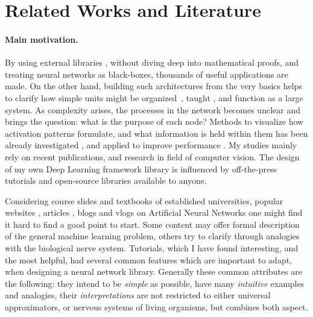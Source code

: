 \section{Related Works and Literature}

\paragraph{Main motivation.} By using external libraries \cite{TF, torch, caffe}, without diving deep into mathematical proofs, and treating neural networks as black-boxes, thousands of useful applications \cite{haykin2004comprehensive} are made. 
On the other hand, building such architectures from the very basics helps to clarify how simple units might be organized~\cite{milo2002network}, taught \cite{werbos1994roots}, and function \cite{hornik1989multilayer} as a large system. 
As complexity arises, the processes in the network becomes unclear and brings the question: what is the purpose of each node? 
Methods to visualize how activation patterns formulate, and what information is held within them has been already investigated \cite{yosinski2015understanding}, and applied to improve performance \cite{zeiler2014visualizing}. 
My studies mainly rely on recent publications, and research in field of computer vision. The design of my own Deep Learning framework library is influenced by off-the-press tutorials \cite{Goodfellow-et-al-2016-Book, deeplearningdotnet, nnsdl, stanfordlectures, gibiansky} and open-source libraries \cite{TF, torch, caffe} available to anyone.

Considering course slides \cite{stanfordlectures, oxfordlectures} and textbooks \cite{Goodfellow-et-al-2016-Book, werbos1994roots, bengio2009learning} of established universities, popular websites \cite{deeplearningdotnet, pedregosa2011scikit}, 
articles \cite{lecun2015deep}, blogs \cite{gibiansky, karpathyblog} and vlogs \cite{vlog1} on Artificial Neural Networks one might find it hard to find a good point to start. 
Some content may offer formal description of the general machine learning problem, others try to clarify through analogies with the biological nerve system.
Tutorials, which I have found interesting, and the most helpful, had several common features which are important to adapt, when designing a neural network library.
Generally these common attributes are the following: 
they intend to be \emph{simple} as possible, 
have many \emph{intuitive} examples and analogies,
their \emph{interpretations} are not restricted to either universal approximators, 
or nervous systems of living organisms, but combines both aspect.

